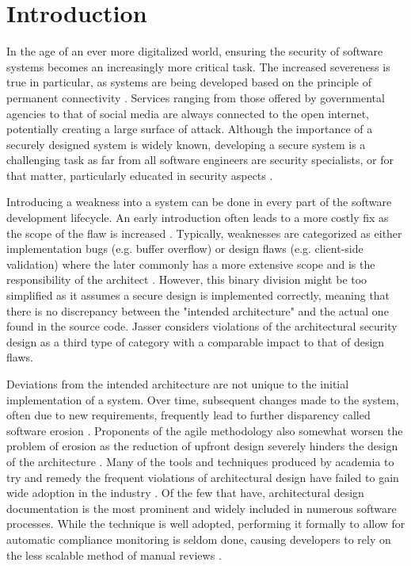 \chapter{Introduction}
In the age of an ever more digitalized world, ensuring the security of software systems becomes an increasingly more critical task. The increased severeness is true in particular, as systems are being developed based on the principle of permanent connectivity \cite{felderer_security_2016}.  Services ranging from those offered by governmental agencies to that of social media are always connected to the open internet, potentially creating a large surface of attack. Although the importance of a securely designed system is widely known, developing a secure system is a challenging task as far from all software engineers are security specialists, or for that matter, particularly educated in security aspects \cite{yoshioka_survey_2008}.

Introducing a weakness into a system can be done in every part of the software development lifecycle. An early introduction often leads to a more costly fix as the scope of the flaw is increased \cite{mcgraw_software_2004}. Typically, weaknesses are categorized as either implementation bugs (e.g. buffer overflow) or design flaws (e.g. client-side validation) where the later commonly has a more extensive scope and is the responsibility of the architect \cite{arce_avoiding_2014}. However, this binary division might be too simplified as it assumes a secure design is implemented correctly, meaning that there is no discrepancy between the "intended architecture" and the actual one found in the source code. Jasser \cite{franch_constraining_2019} considers violations of the architectural security design as a third type of category with a comparable impact to that of design flaws.

Deviations from the intended architecture are not unique to the initial implementation of a system. Over time, subsequent changes made to the system, often due to new requirements, frequently lead to further disparency called software erosion \cite{de_silva_controlling_2012}. Proponents of the agile methodology also somewhat worsen the problem of erosion as the reduction of upfront design severely hinders the design of the architecture \cite{van_gurp_design_2002}. Many of the tools and techniques produced by academia to try and remedy the frequent violations of architectural design have failed to gain wide adoption in the industry \cite{de_silva_controlling_2012}.  Of the few that have, architectural design documentation is the most prominent and widely included in numerous software processes. While the technique is well adopted, performing it formally to allow for automatic compliance monitoring is seldom done, causing developers to rely on the less scalable method of manual reviews \cite{de_silva_controlling_2012}.

